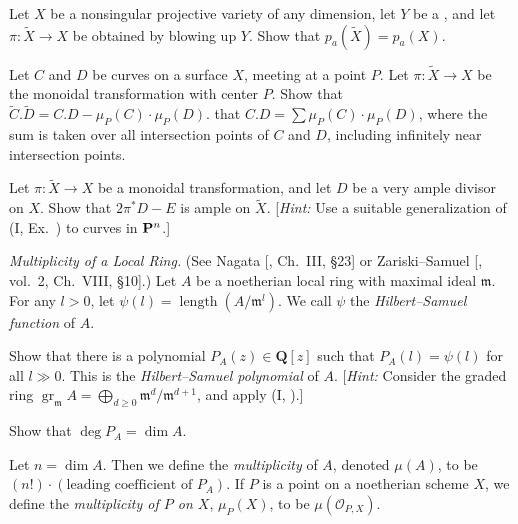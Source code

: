 {\Exercises
{\fontsize{9}{10.0}\selectfont\setlength{\parskip}{0pt}
\begin{description}[style=multiline,labelwidth=1.8em,leftmargin=2.15em,itemsep=3pt,topsep=0pt,parsep=0pt]
\item[\hypertarget{ex-V-3.1}{}3.1.] Let $X$ be a nonsingular projective variety of any dimension, let $Y$ be a , and let $\pi\colon\widetilde X\to X$ be obtained by blowing up $Y$. Show that $p_a(\widetilde X)=p_a(X)$.
\item[\hypertarget{ex-V-3.2}{}3.2.] Let $C$ and $D$ be curves on a surface $X$, meeting at a point $P$. Let $\pi\colon\widetilde X\to X$ be the monoidal transformation with center $P$. Show that $\widetilde C.\widetilde D=C.D-\mu_P(C)\cdot\mu_P(D)$.  that $C.D=\sum\mu_P(C)\cdot\mu_P(D)$, where the sum is taken over all intersection points of $C$ and $D$, including infinitely near intersection points.
\item[\hypertarget{ex-V-3.3}{}3.3.] Let $\pi\colon\widetilde X\to X$ be a monoidal transformation, and let $D$ be a very ample divisor on $X$. Show that $2\pi^*D-E$ is ample on $\widetilde X$. [\emph{Hint:} Use a suitable generalization of (I, Ex.~) to curves in $\mathbf{P}^n$.]
\item[\hypertarget{ex-V-3.4}{}3.4.] \emph{Multiplicity of a Local Ring.} (See Nagata [, Ch.~III, \S23] or Zariski--Samuel [, vol.~2, Ch.~VIII, \S10].) Let $A$ be a noetherian local ring with maximal ideal $\mathfrak m$. For any $l>0$, let $\psi(l)=\operatorname{length}(A/\mathfrak m^l)$. We call $\psi$ the \emph{Hilbert--Samuel function} of $A$.
\begin{parts}
\item Show that there is a polynomial $P_A(z)\in\mathbf Q[z]$ such that $P_A(l)=\psi(l)$ for all $l\gg0$. This is the \emph{Hilbert--Samuel polynomial} of $A$. [\emph{Hint:} Consider the graded ring $\operatorname{gr}_{\mathfrak m}A=\bigoplus_{d\ge0}\mathfrak m^d/\mathfrak m^{d+1}$, and apply (I, ).]
\item Show that $\deg P_A=\dim A$.
\item Let $n=\dim A$. Then we define the \emph{multiplicity} of $A$, denoted $\mu(A)$, to be $(n!)\cdot(\text{leading coefficient of }P_A)$. If $P$ is a point on a noetherian scheme $X$, we define the \emph{multiplicity of $P$ on $X$}, $\mu_P(X)$, to be $\mu(\mathcal O_{P,X})$.

\end{parts}
\end{description}}}
